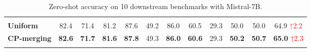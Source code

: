 \documentclass[10pt]{article} %
\begin{document}
\begin{table}[ht]
\begin{adjustbox}
\begin{tabular}{l|cccccccccc|c}
\midrule
\rowcolor{lightgray}\multicolumn{12}{c}{\textbf{Mistral (7B) with C-LoRA library }} \\
\textbf{Uniform}  & 82.4  & 71.4 & 81.2 & 87.6 & 49.2 & 86.0 & 60.5  & 29.3 & 50.0 & 50.0 & \cellcolor[HTML]{FDE9E8}64.9 \textcolor{red}{\scriptsize ↑2.2} \\ 
\textbf{CP-merging} & \textbf{82.6} & \textbf{71.7} & \textbf{81.6} & \textbf{87.8} & 49.3  & \textbf{86.0} & \textbf{60.6} & 29.3  & \textbf{50.2}  & \textbf{50.7} & \cellcolor[HTML]{FDE9E8}\textbf{65.0} \textcolor{red}{\scriptsize ↑2.3} \\ \hline

\Xhline{1.6pt}
\end{tabular}
\end{adjustbox}
\caption{Zero-shot accuracy on 10 downstream benchmarks with Mistral-7B.}
\label{tab:zeroshot_mistral}
\end{table}
\end{document}
